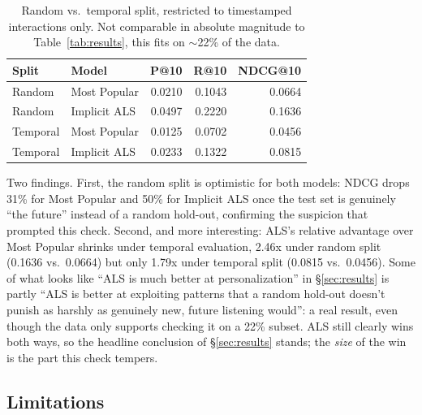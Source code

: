 \documentclass[11pt,a4paper]{article}
\newcommand{\secref}[1]{\S\ref{#1}}
\begin{document}
\begin{table}[!htbp]
\centering
\begin{tabular}{llrrr}
\toprule
Split & Model & P@10 & R@10 & NDCG@10 \\
\midrule
Random & Most Popular & 0.0210 & 0.1043 & 0.0664 \\
Random & Implicit ALS & 0.0497 & 0.2220 & 0.1636 \\
Temporal & Most Popular & 0.0125 & 0.0702 & 0.0456 \\
Temporal & Implicit ALS & 0.0233 & 0.1322 & 0.0815 \\
\bottomrule
\end{tabular}
\caption{Random vs.\ temporal split, restricted to timestamped interactions only. Not comparable in absolute magnitude to Table~\ref{tab:results}, this fits on $\sim$22\% of the data.}
\end{table}

Two findings. First, the random split is optimistic for both models: NDCG drops 31\% for Most Popular and 50\% for Implicit ALS once the test set is genuinely ``the future'' instead of a random hold-out, confirming the suspicion that prompted this check. Second, and more interesting: ALS's relative advantage over Most Popular shrinks under temporal evaluation, 2.46x under random split (0.1636 vs.\ 0.0664) but only 1.79x under temporal split (0.0815 vs.\ 0.0456). Some of what looks like ``ALS is much better at personalization'' in \secref{sec:results} is partly ``ALS is better at exploiting patterns that a random hold-out doesn't punish as harshly as genuinely new, future listening would'': a real result, even though the data only supports checking it on a 22\% subset. ALS still clearly wins both ways, so the headline conclusion of \secref{sec:results} stands; the \emph{size} of the win is the part this check tempers.

\subsection{Limitations}
\end{document}
